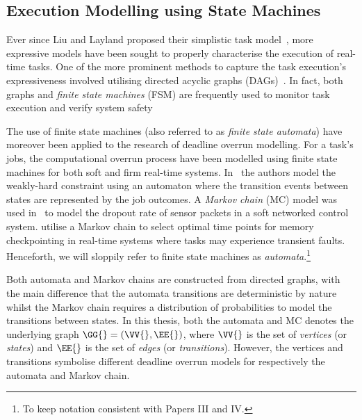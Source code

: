 \subsection{Execution Modelling using State Machines}%
\label{sec:background:fsm}%
%
Ever since Liu and Layland proposed their simplistic task model~\cite{Liu:1973}, more expressive models have been sought to properly characterise the execution of real-time tasks.
One of the more prominent methods to capture the task execution's expressiveness involved utilising directed acyclic graphs (DAGs)~\cite{Baruah:2003, Chakraborty:2005, Stigge:2011}.
In fact, both graphs and \emph{finite state machines} (FSM) are frequently used to monitor task execution and verify system safety~\cite{Kumar:2012, Dai:2020, Hertneck:2020}

The use of finite state machines (also referred to as \emph{finite state automata}) have moreover been applied to the research of deadline overrun modelling.
For a task's jobs, the computational overrun process have been modelled using finite state machines for both soft and firm real-time systems.
In~\cite{Horssen:2016} the authors model the \tAM{} weakly-hard constraint using an automaton where the transition events between states are represented by the job outcomes.
A \emph{Markov chain} (MC) model was used in~\cite{Ling:2003} to model the dropout rate of sensor packets in a soft networked control system.
\cite{Kwak:2001} utilise a Markov chain to select optimal time points for memory checkpointing in real-time systems where tasks may experience transient faults.
Henceforth, we will sloppily refer to finite state machines as \emph{automata}.\footnote{To keep notation consistent with Papers III and IV.}

Both automata and Markov chains are constructed from directed graphs, with the main difference that the automata transitions are deterministic by nature whilst the Markov chain requires a distribution of probabilities to model the transitions between states.
In this thesis, both the automata and MC denotes the underlying graph $\GG{} = (\VV{}, \EE{})$, where $\VV{}$ is the set of \emph{vertices} (or \emph{states}) and $\EE{}$ is the set of \emph{edges} (or \emph{transitions}).
However, the vertices and transitions symbolise different deadline overrun models for respectively the automata and Markov chain.

